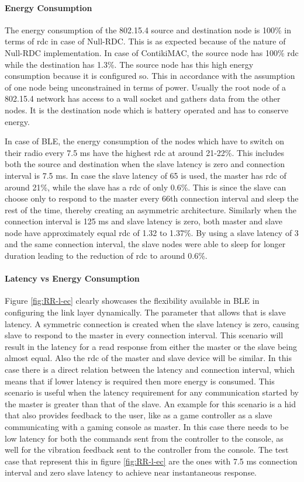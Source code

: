 \paragraph{Energy Consumption}
The energy consumption of the 802.15.4 source and destination node is 100\% in terms of \gls{rdc} in case of Null-RDC. This is as expected because of the nature of Null-RDC implementation. In case of ContikiMAC, the source node has 100\% \gls{rdc} while the destination has 1.3\%. The source node has this high energy consumption because it is configured so. This in accordance with the assumption of one node being unconstrained in terms of power. Usually the root node of a 802.15.4 network has access to a wall socket and gathers data from the other nodes. It is the destination node which is battery operated and has to conserve energy. 

In case of BLE, the energy consumption of the nodes which have to switch on their radio every 7.5 ms have the highest \gls{rdc} at around 21-22\%. This includes both the source and destination when the slave latency is zero and connection interval is 7.5 ms. In case the slave latency of 65 is used, the master has \gls{rdc} of around 21\%, while the slave has a \gls{rdc} of only 0.6\%. This is since the slave  can choose only to respond to the master every 66th connection interval and sleep the rest of the time, thereby creating an asymmetric architecture. Similarly when the connection interval is 125 ms and slave latency is zero, both master and slave node have 
approximately equal \gls{rdc} of 1.32 to 1.37\%. By using a slave latency of 3 and the same connection interval, the slave nodes were able to sleep for longer duration leading to the reduction of \gls{rdc} to around 0.6\%.

\paragraph{Latency vs Energy Consumption}

Figure \ref{fig:RR-l-ec} clearly showcases the flexibility available in BLE in configuring the link layer dynamically. The parameter that allows that is slave latency. A symmetric connection is created when the slave latency is zero, causing slave to respond to the master in every connection interval. This scenario will result in the latency for a read response from either the master or the slave being almost equal. Also the \gls{rdc} of the master and slave device will be similar. In this case there is a direct relation between the latency and connection interval, which means that if lower latency is required then more energy is consumed. This scenario is useful when the latency requirement for any communication started by the master is greater than that of the slave. An example for this scenario is a \gls{hid} that also provides feedback to the user, like as a game controller as a slave communicating with a gaming console as master. In this case there needs to be low latency for both the commands sent from the controller to the console, as well for the vibration feedback sent to the controller from the console. The test case that represent this in figure \ref{fig:RR-l-ec} are the ones with 7.5 ms connection interval and zero slave latency to achieve near instantaneous response.

